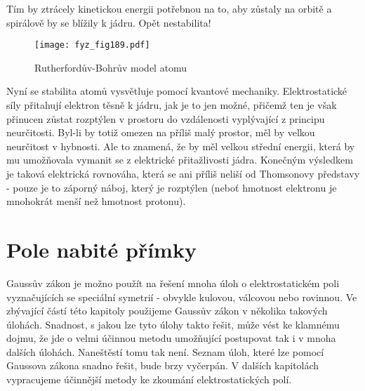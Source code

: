{  Tím by ztrácely kinetickou energii potřebnou na to, aby zůstaly na orbitě a spirálově by se 
  blížily k jádru. Opět nestabilita!
  \begin{figure}[ht!] %
    \centering
    \texttt{[image: fyz\_fig189.pdf]}
    \caption{Rutherfordův-Bohrův model atomu}
    \label{fyz:fig189}
  \end{figure}      
  
  Nyní se stabilita atomů vysvětluje pomocí kvantové mechaniky. Elektrostatické síly přitahují 
  elektron těsně k jádru, jak je to jen možné, přičemž ten je však přinucen zůstat rozptýlen v 
  prostoru do vzdálenosti vyplývající z principu neurčitosti. Byl-li by totiž omezen na příliš 
  malý prostor, měl by velkou neurčitost v hybnosti. Ale to znamená, že by měl velkou střední 
  energii, která by mu umožňovala vymanit se z elektrické přitažlivosti jádra. Konečným 
  výsledkem je taková elektrická rovnováha, která se ani příliš neliší od Thomsonovy představy 
  - pouze je to záporný náboj, který je rozptýlen (neboť hmotnost elektronu je mnohokrát menší 
  než hmotnost protonu).

\section{Pole nabité přímky}\label{fyz:IIchapVsecIV}
  Gaussův zákon je možno použít na řešení mnoha úloh o elektrostatickém poli vyznačujících se 
  speciální symetrií - obvykle kulovou, válcovou nebo rovinnou. Ve zbývající částí této 
  kapitoly použijeme Gaussův zákon v několika takových úlohách. Snadnost, s jakou lze tyto 
  úlohy takto řešit, může vést ke klamnému dojmu, že jde o velmi účinnou metodu umožňující 
  postupovat tak i v mnoha dalších úlohách. Naneštěstí tomu tak není. Seznam úloh, které lze 
  pomocí Gaussova zákona snadno řešit, bude brzy vyčerpán. V dalších kapitolách vypracujeme 
  účinnější metody ke zkoumání elektrostatických polí.
  
}
